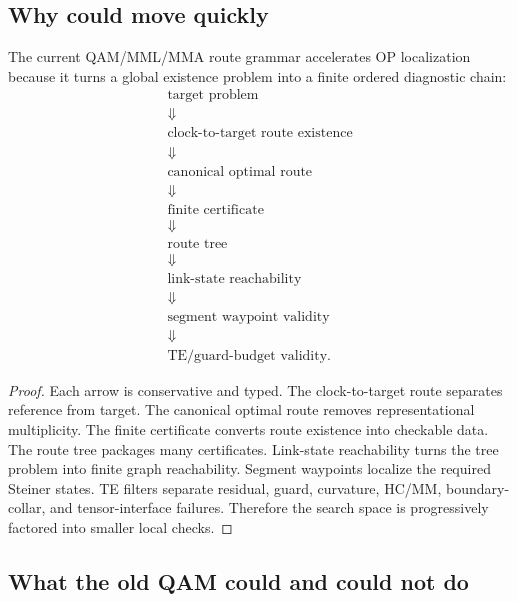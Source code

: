 \subsection{Why could move quickly}
\label{subsec:v410r17-why-r10-r16-moved-quickly}

\begin{theorem}
\label{thm:v410r17-new-qam-narrowing-principle}
The current QAM/MML/MMA route grammar accelerates OP localization because it
turns a global existence problem into a finite ordered diagnostic chain:
\[
\begin{array}{c}
\text{target problem}\\
\Downarrow\\
\text{clock-to-target route existence}\\
\Downarrow\\
\text{canonical optimal route}\\
\Downarrow\\
\text{finite certificate}\\
\Downarrow\\
\text{route tree}\\
\Downarrow\\
\text{link-state reachability}\\
\Downarrow\\
\text{segment waypoint validity}\\
\Downarrow\\
\text{TE/guard-budget validity}.
\end{array}
\]
\end{theorem}

\begin{proof}
Each arrow is conservative and typed. The clock-to-target route separates
reference from target. The canonical optimal route removes representational
multiplicity. The finite certificate converts route existence into checkable
data. The route tree packages many certificates. Link-state reachability
turns the tree problem into finite graph reachability. Segment waypoints
localize the required Steiner states. TE filters separate residual, guard,
curvature, HC/MM, boundary-collar, and tensor-interface failures. Therefore the
search space is progressively factored into smaller local checks.
\end{proof}

\subsection{What the old QAM could and could not do}
\label{subsec:v410r17-old-qam-could-and-could-not}

